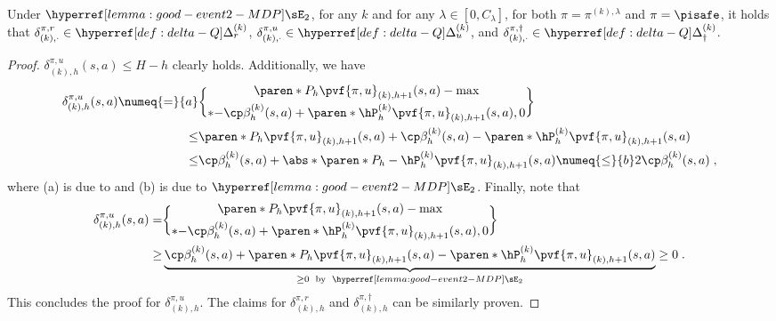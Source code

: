 \begin{lemma}\label{lemma:delta-bound}
Under $\confevent$, for any $k$ and for any $\lambda \in [0, C_\lambda]$, for both $\pi = \pi^{(k), \lambda}$ and $\pi=\pisafe$, it holds that
\(\delta^{\pi, r}_{(k), \cdot} \in \Deltar\),
\(\delta^{\pi, u}_{(k), \cdot} \in \Deltau\),
and  \(\delta^{\pi, \dagger}_{(k), \cdot} \in \Deltac\).
\end{lemma}
\begin{proof}
$\delta^{\pi, u}_{(k), h}(s, a) \leq H-h$ clearly holds.
Additionally, we have
\begin{align*}
\delta^{\pi, u}_{(k), h}(s, a) 
\numeq{=}{a}&\paren*{P_h \pvf{\pi, u}_{(k), h+1}}(s, a) - \max\brace*{-\cp \beta^{(k)}_h(s, a) + \paren*{\hP^{(k)}_h \pvf{\pi, u}_{(k), h+1}}(s, a), 0}\\
\leq &\paren*{P_h \pvf{\pi, u}_{(k), h+1}}(s, a) +\cp\beta^{(k)}_h(s, a) - \paren*{\hP^{(k)}_h \pvf{\pi, u}_{(k), h+1}}(s, a) \\
\leq &\cp \beta^{(k)}_h(s, a) + \abs*{\paren*{P_h - \hP^{(k)}_h} \pvf{\pi, u}_{(k), h+1}}(s, a) \numeq{\leq}{b} 2\cp\beta^{(k)}_h(s, a)\;,
\end{align*}
where (a) is due to  and (b) is due to $\confevent$.
Finally, note that 
\begin{align*}
\delta^{\pi, u}_{(k), h}(s, a)
=&\paren*{P_h \pvf{\pi, u}_{(k), h+1}}(s, a) - \max\brace*{-\cp \beta^{(k)}_h(s, a) + \paren*{\hP^{(k)}_h \pvf{\pi, u}_{(k), h+1}}(s, a), 0}\\
\geq&
\underbrace{\cp \beta^{(k)}_h(s, a) + \paren*{P_h \pvf{\pi, u}_{(k), h+1}}(s, a) - \paren*{\hP^{(k)}_h \pvf{\pi, u}_{(k), h+1}}(s, a)}_{\geq 0 \;\text{ by }\; \confevent}
\geq 0\;.
\end{align*}
This concludes the proof for $\delta^{\pi, u}_{(k), h}$.
The claims for $\delta^{\pi, r}_{(k), h}$ and $\delta^{\pi, \dagger}_{(k), h}$ can be similarly proven.
\end{proof}

